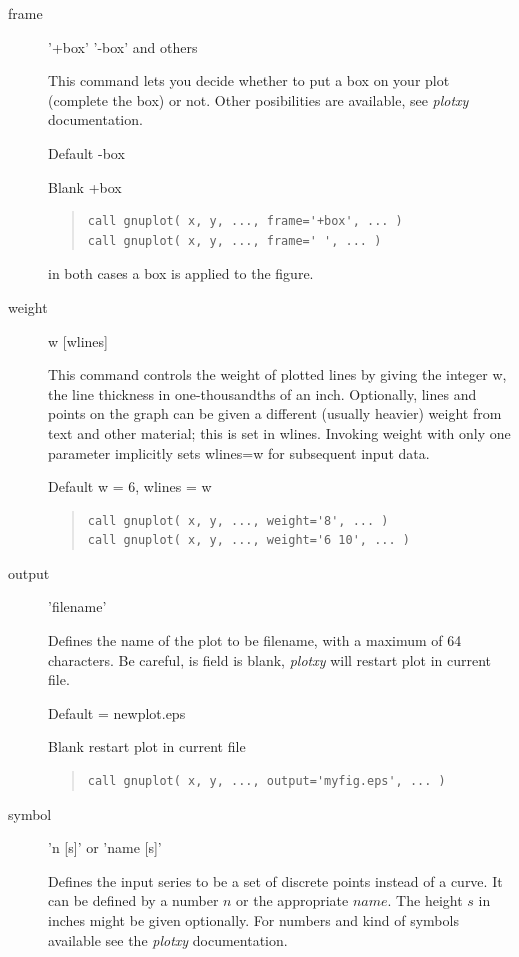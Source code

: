 \documentclass{article}
\begin{document}
\begin{description}
\item[frame] '+box' '-box' and others

This command lets you decide whether to put a box on your plot (complete the box) or not. Other posibilities are available, see {\it plotxy} documentation.

Default -box

Blank +box
\begin{quote}
\begin{verbatim}
call gnuplot( x, y, ..., frame='+box', ... )
call gnuplot( x, y, ..., frame=' ', ... )
\end{verbatim}
\end{quote}
in both cases a box is applied to the figure.

\item[weight] w [wlines]

This command controls the weight of plotted lines by giving
the integer w, the line thickness in one-thousandths of an inch. Optionally, lines
and points on the graph can be given a different (usually heavier) weight from text
and other material; this is set in wlines. Invoking weight with only one parameter
implicitly sets wlines=w for subsequent input data.

Default w = 6, wlines = w

\begin{quote}
\begin{verbatim}
call gnuplot( x, y, ..., weight='8', ... )
call gnuplot( x, y, ..., weight='6 10', ... )
\end{verbatim}
\end{quote}

\item[output] 'filename'

Defines the name of the plot to be filename, with a maximum of 64 characters. Be careful, is field is blank, {\it plotxy} will restart plot in current file. 

Default = newplot.eps

Blank restart plot in current file
\begin{quote}
\begin{verbatim}
call gnuplot( x, y, ..., output='myfig.eps', ... )
\end{verbatim}
\end{quote}

\item[symbol] 'n [s]' or 'name [s]'

Defines the input series to be a set of discrete points instead of a curve. It can be defined by a number $n$ or the appropriate $name$. The height $s$ in inches might be given optionally. For numbers and kind of symbols available see the {\it plotxy} documentation. 


\end{description}
\end{document}
